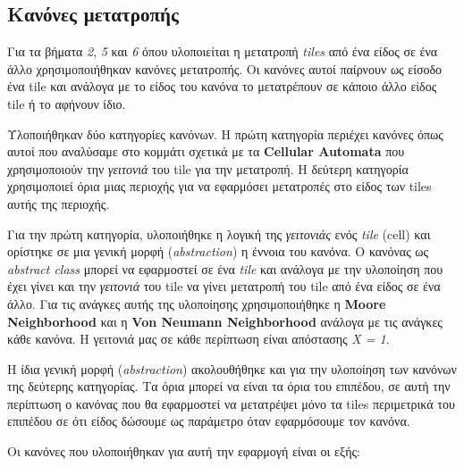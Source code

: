 \subsection{Κανόνες μετατροπής}
Για τα βήματα \textit{2}, \textit{5} και \textit{6} όπου υλοποιείται η μετατροπή \textit{tiles} από ένα είδος σε ένα άλλο χρησιμοποιήθηκαν κανόνες μετατροπής. Οι κανόνες αυτοί παίρνουν ως είσοδο ένα tile και ανάλογα με το είδος του κανόνα το μετατρέπουν σε κάποιο άλλο είδος tile ή το αφήνουν ίδιο.
\par
Υλοποιήθηκαν δύο κατηγορίες κανόνων. H πρώτη κατηγορία περιέχει κανόνες όπως αυτοί που αναλύσαμε στο κομμάτι σχετικά με τα \textbf{Cellular Automata} που χρησιμοποιούν την \textit{γειτονιά} του tile για την μετατροπή. Η δεύτερη κατηγορία χρησιμοποιεί όρια μιας περιοχής για να εφαρμόσει μετατροπές στο είδος των tiles αυτής της περιοχής. 
\par
Για την πρώτη κατηγορία, υλοποιήθηκε η λογική της \textit{γειτονιάς} ενός \textit{tile} (cell) και ορίστηκε σε μια γενική μορφή (\textit{abstraction}) η έννοια του κανόνα. Ο κανόνας ως \textit{abstract class} μπορεί να εφαρμοστεί σε ένα \textit{tile} και ανάλογα με την υλοποίηση που έχει γίνει και την \textit{γειτονιά} του tile να γίνει μετατροπή του tile από ένα είδος σε ένα άλλο. Για τις ανάγκες αυτής της υλοποίησης χρησιμοποιήθηκε η \textbf{Moore Neighborhood} και η \textbf{Von Neumann Neighborhood} ανάλογα με τις ανάγκες κάθε κανόνα. Η γειτονιά μας σε κάθε περίπτωση είναι απόστασης \textit{X = 1}.
\par
Η ίδια γενική μορφή (\textit{abstraction}) ακολουθήθηκε και για την υλοποίηση των κανόνων της δεύτερης κατηγορίας. Τα όρια μπορεί να είναι τα όρια του επιπέδου, σε αυτή την περίπτωση ο κανόνας που θα εφαρμοστεί να μετατρέψει μόνο τα tiles περιμετρικά του επιπέδου σε ότι είδος δώσουμε ως παράμετρο όταν εφαρμόσουμε τον κανόνα.
\par
Οι κανόνες που υλοποιήθηκαν για αυτή την εφαρμογή είναι οι εξής:

